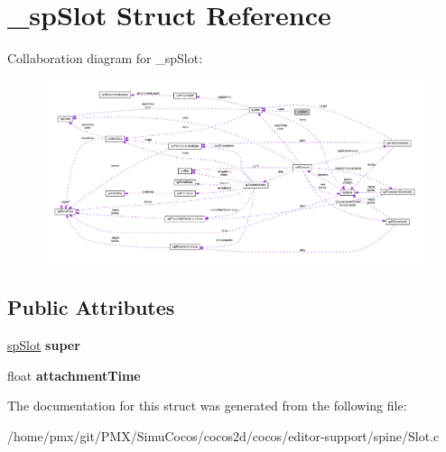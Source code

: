 \hypertarget{struct__spSlot}{}\section{\+\_\+sp\+Slot Struct Reference}
\label{struct__spSlot}


Collaboration diagram for \+\_\+sp\+Slot\+:
\nopagebreak
\begin{figure}[H]
\begin{center}
\leavevmode
\includegraphics[width=350pt]{struct__spSlot__coll__graph}
\end{center}
\end{figure}
\subsection*{Public Attributes}
\begin{DoxyCompactItemize}
\item 
\mbox{\label{struct__spSlot_a44e16a7c91d07bc354116e5d5cfbb3bd}} 
\hyperlink{structspSlot}{sp\+Slot} {\bfseries super}
\item 
\mbox{\label{struct__spSlot_a94b7a3d3936f76b8d779d0828e108e05}} 
float {\bfseries attachment\+Time}
\end{DoxyCompactItemize}


The documentation for this struct was generated from the following file\+:\begin{DoxyCompactItemize}
\item 
/home/pmx/git/\+P\+M\+X/\+Simu\+Cocos/cocos2d/cocos/editor-\/support/spine/Slot.\+c\end{DoxyCompactItemize}
